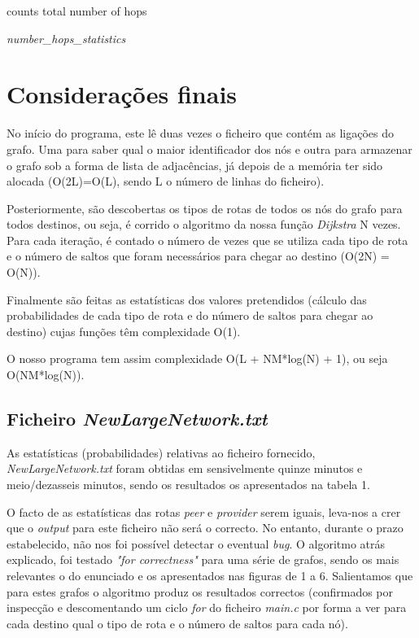 \documentclass[a4paper]{article}
\begin{document}
\begin{algorithm}[H]
 counts total number of hops\;
 
 
 \caption{\textit{number\_hops\_statistics}}
\end{algorithm}

\section{Considerações finais}
No início do programa, este lê duas vezes o ficheiro que contém as ligações do grafo. Uma para saber qual o maior identificador dos nós e outra para armazenar o grafo sob a forma de lista de adjacências, já depois de a memória ter sido alocada (O(2L)=O(L), sendo L o número de linhas do ficheiro).

Posteriormente, são descobertas os tipos de rotas de todos os nós do grafo para todos destinos, ou seja, é corrido o algoritmo da nossa função \textit{Dijkstra} N vezes. Para cada iteração, é contado o número de vezes que se utiliza cada tipo de rota e o número de saltos que foram necessários para chegar ao destino (O(2N) = O(N)).

Finalmente são feitas as estatísticas dos valores pretendidos (cálculo das probabilidades de cada tipo de rota e do número de saltos para chegar ao destino) cujas funções têm complexidade O(1).

O nosso programa tem assim complexidade O(L + NM*log(N) + 1), ou seja O(NM*log(N)).

\subsection{Ficheiro \textit{NewLargeNetwork.txt}}
As estatísticas (probabilidades) relativas ao ficheiro fornecido, \textit{NewLargeNetwork.txt} foram obtidas em sensivelmente quinze minutos e meio/dezasseis minutos, sendo os resultados os apresentados na tabela 1.

O facto de as estatísticas das rotas \textit{peer} e \textit{provider} serem iguais, leva-nos a crer que o \textit{output} para este ficheiro não será o correcto. No entanto, durante o prazo estabelecido, não nos foi possível detectar o eventual \textit{bug}. O algoritmo atrás explicado, foi testado \textit{"for correctness"} para uma série de grafos, sendo os mais relevantes o do enunciado e os apresentados nas figuras de 1 a 6. Salientamos que para estes grafos o algoritmo produz os resultados correctos (confirmados por inspecção e descomentando um ciclo \textit{for} do ficheiro \textit{main.c} por forma a ver para cada destino qual o tipo de rota e o número de saltos para cada nó).
\end{document}
